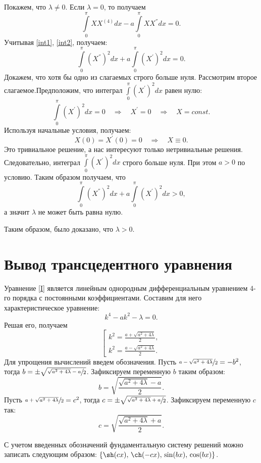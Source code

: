 \documentclass[12pt, a4paper]{article}
\begin{document}
Покажем, что $\lambda\ne 0$. Если $\lambda = 0$, то получаем
\[
\int\limits_0^\pi XX^{(4)} dx - a\int\limits_0^\pi XX^{''} dx =0.
\]
Учитывая \eqref{int1}, \eqref{int2}, получаем:
\[
\int\limits_0^\pi (X^{''})^2 dx + a\int\limits_0^\pi (X^{'})^2 dx =0.
\]
Докажем, что хотя бы одно из слагаемых строго больше нуля. Рассмотрим второе слагаемое.Предположим, что интеграл $\int\limits_0^\pi (X^{'})^2 dx$ равен нулю:
\[
\int\limits_0^\pi (X^{'})^2 dx = 0 \quad \Rightarrow \quad X^{'}=0 \quad \Rightarrow \quad X=const.
\]
Используя начальные условия, получаем:
\[
X(0)=X^{'}(0)=0 \quad \Rightarrow \quad X \equiv 0.
\]
Это тривиальное решение, а нас интересуют только нетривиальные решения. Сле\-до\-ва\-тель\-но, интеграл $\int\limits_0^\pi (X^{'})^2 dx$ строго больше нуля.
При этом $a>0$ по условию. Таким образом получаем, что
\[
\int\limits_0^\pi (X^{''})^2 dx + a\int\limits_0^\pi (X^{'})^2 dx > 0,
\]
а значит $\lambda$ не может быть равна нулю.

Таким образом, было доказано, что  $\lambda >0$.
\section{Вывод трансцедентного уравнения}
Уравнение \eqref{I} является линейным однородным дифференциальным уравнением 4-го порядка с постоянными коэффициентами. 
Составим для него характеристическое уравнение:
\[
k^4 - ak^2 - \lambda =0.
\]
Решая его, получаем 
\[
\left[
\begin{gathered}
k^2 = \frac{a+\sqrt{a^2+4\lambda}}{2}, \\
k^2 = \frac{a-\sqrt{a^2+4\lambda}}{2}.
\end{gathered}
\right.
\]
Для упрощения вычислений введем обозначения. Пусть
$\sfrac{a-\sqrt{a^2+4\lambda}}{2}=-b^2$,
тогда
$b= \pm \sqrt{\sfrac{\sqrt{a^2+4\lambda}-a}{2}}$. Зафиксируем переменную $b$ таким образом:
\begin{equation}
b=\sqrt{\frac{\sqrt{a^2+4\lambda}-a}{2}}. \label{b}
\end{equation}
Пусть
$\sfrac{a+\sqrt{a^2+4\lambda}}{2}=c^2$, 
тогда
$c= \pm \sqrt{\sfrac{\sqrt{a^2+4\lambda}+a}{2}}$. Зафиксируем переменную $c$ так:
\begin{equation}
c=\sqrt{\frac{\sqrt{a^2+4\lambda}+a}{2}}.\label{c}
\end{equation}

С учетом введенных обозначений фундаментальную систему решений можно записать следующим образом: $\{\sh (cx),\, \ch (-cx),\, \sin (bx),\, \cos(bx)\}$.
\end{document}
